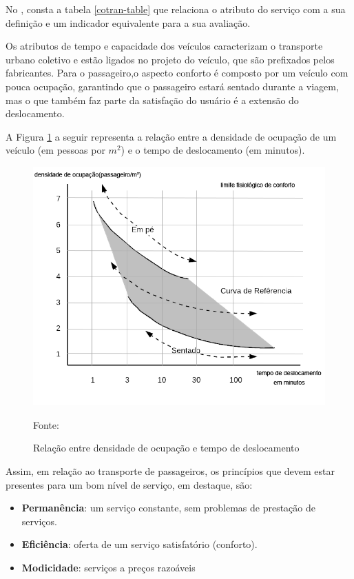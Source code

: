 No , consta a tabela \ref{cotran-table} que 
relaciona o atributo do serviço com a sua definição e um indicador equivalente para a sua avaliação.
 
Os atributos de tempo e capacidade dos veículos caracterizam o transporte urbano coletivo e estão ligados no projeto do veículo, que são prefixados pelos fabricantes. Para o passageiro,o aspecto conforto é composto por um veículo com pouca ocupação, garantindo que o passageiro estará sentado durante a viagem, mas o que também faz parte da satisfação do usuário é a extensão do deslocamento.

A Figura \ref{figura-ocupacao-tempo} a seguir representa a relação entre a densidade de ocupação de um veículo (em pessoas por $m^2$) e o tempo de deslocamento (em minutos).

\begin{figure}[H]
  \centering
  \caption{Relação entre densidade de ocupação e tempo de deslocamento}
 \includegraphics[scale=0.55]{imagens/limite-fisiologico.png} \par
\bigskip
Fonte: \cite[p.307]{MARTINS}
\label{figura-ocupacao-tempo}
\end{figure}
Assim, em relação ao transporte de passageiros, os princípios que devem estar presentes para um bom nível de serviço, em destaque, são: 
\begin{itemize}
    \item \textbf{Permanência}: um serviço constante, sem problemas de prestação de serviços.
    \item \textbf{Eficiência}: oferta de um serviço satisfatório (conforto).
    \item \textbf{Modicidade}: serviços a preços razoáveis
\end{itemize}

